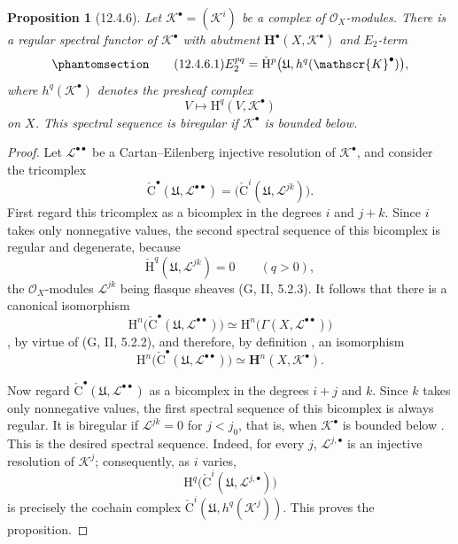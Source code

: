 \documentclass[oneside]{amsart}
\theoremstyle{ega-env-style}
\theoremstyle{ega-thm-env-style}
\newtheorem*{proposition}{Proposition}
\theoremstyle{ega-defn-env-style}
\def\mathcal{\mathscr}
\def\sh{\mathcal}                   %
\def\bb{\mathbf}                    %
\def\HH{\mathrm{H}}                 %
\def\CHH{\check{\HH}}               %
\def\isoto{\simeq} %
\newcommand{\oldpage}[2][]{{\marginnote{\normalfont{\textbf{#1}~|~#2}}}\ignorespaces}
\let\EGAOriginalLabel\label
\renewcommand{\label}[1]{\phantomsection\EGAOriginalLabel{#1}}
\begin{document}
\begin{proposition}[12.4.6]
\label{0.12.4.6}
Let $\sh{K}^\bullet=(\sh{K}^i)$ be a complex of
$\sh{O}_X$-modules.
There is a regular spectral functor of $\sh{K}^\bullet$ with
abutment $\bb{H}^\bullet(X,\sh{K}^\bullet)$ and $E_2$-term
\begin{equation}
\label{0.12.4.6.1}
\tag{12.4.6.1}
  E_2^{pq}
  =
  \CHH^p\bigl(\mathfrak{U},h^q(\sh{K}^\bullet)\bigr),
\end{equation}
where $h^q(\sh{K}^\bullet)$ denotes the presheaf complex
\[
  V\longmapsto\HH^q(V,\sh{K}^\bullet)
\]
on $X$.
This spectral sequence is biregular if $\sh{K}^\bullet$ is bounded
below.
\end{proposition}

\begin{proof}
Let $\sh{L}^{\bullet\bullet}$ be a Cartan--Eilenberg injective
resolution of $\sh{K}^\bullet$, and consider the tricomplex
\[
  \check{\mathrm{C}}^\bullet
  (\mathfrak{U},\sh{L}^{\bullet\bullet})
  =
  \bigl(\check{\mathrm{C}}^i
    (\mathfrak{U},\sh{L}^{jk})\bigr).
\]
First regard this tricomplex as a bicomplex in the degrees $i$ and
$j+k$.
Since $i$ takes only nonnegative values, the second spectral sequence
of this bicomplex is regular  and degenerate, because
\[
  \CHH^q(\mathfrak{U},\sh{L}^{jk})=0
  \qquad(q>0),
\]
the $\sh{O}_X$-modules $\sh{L}^{jk}$ being flasque sheaves
\oldpage[0\textsubscript{III}]{64}
(G, II, 5.2.3).
It follows that there is a canonical isomorphism
\[
  \HH^n\bigl(
    \check{\mathrm{C}}^\bullet
      (\mathfrak{U},\sh{L}^{\bullet\bullet})
  \bigr)
  \isoto
  \HH^n\bigl(\Gamma(X,\sh{L}^{\bullet\bullet})\bigr)
\]
, by virtue of (G, II, 5.2.2), and therefore, by
definition , an isomorphism
\[
  \HH^n\bigl(
    \check{\mathrm{C}}^\bullet
      (\mathfrak{U},\sh{L}^{\bullet\bullet})
  \bigr)
  \isoto
  \bb{H}^n(X,\sh{K}^\bullet).
\]

Now regard
$\check{\mathrm{C}}^\bullet
(\mathfrak{U},\sh{L}^{\bullet\bullet})$
as a bicomplex in the degrees $i+j$ and $k$.
Since $k$ takes only nonnegative values, the first spectral sequence
of this bicomplex is always regular.
It is biregular if $\sh{L}^{jk}=0$ for $j<j_0$, that is, when
$\sh{K}^\bullet$ is bounded below .
This is the desired spectral sequence.
Indeed, for every $j$, $\sh{L}^{j,\bullet}$ is an injective
resolution of $\sh{K}^j$; consequently, as $i$ varies,
\[
  \HH^q\bigl(
    \check{\mathrm{C}}^i
      (\mathfrak{U},\sh{L}^{j,\bullet})
  \bigr)
\]
is precisely the cochain complex
$\check{\mathrm{C}}^i(\mathfrak{U},h^q(\sh{K}^j))$.
This proves the proposition.
\end{proof}
\end{document}
